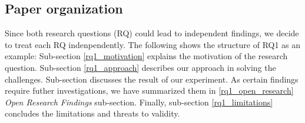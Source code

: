 \subsection{Paper organization}

	Since both research questions (RQ) could lead to independent findings, we decide to treat each RQ indenpendently. The following shows the structure of RQ1 as an example: Sub-section \ref{rq1_motivation} explains the motivation of the research question. Sub-section \ref{rq1_approach} describes our approach in solving the challenges. Sub-section \label{rq1_discussion} discusses the result of our experiment. As certain findings require futher investigations, we have summarized them in \ref{rq1_open_research} \textit{Open Research Findings} sub-section. Finally, sub-section \ref{rq1_limitations} concludes the limitations and threats to validity.